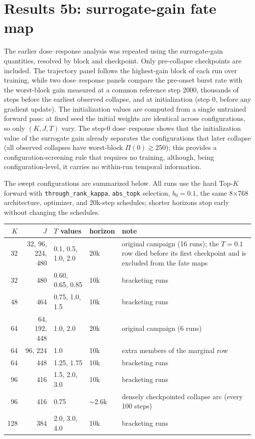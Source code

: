 \documentclass[11pt,a4paper]{article}
\newcommand{\code}[1]{\texttt{#1}}
\newcommand{\Pisurr}{\Pi}
\begin{document}
\section{Results 5b: surrogate-gain fate map}

The earlier dose--response analysis was repeated using the surrogate-gain quantities, resolved by block and checkpoint. Only pre-collapse checkpoints are included. The trajectory panel follows the highest-gain block of each run over training, while two dose--response panels compare the pre-onset burst rate with the worst-block gain measured at a common reference step 2000, thousands of steps before the earliest observed collapse, and at initialization (step 0, before any gradient update). The initialization values are computed from a single untrained forward pass: at fixed seed the initial weights are identical across configurations, so only \((K,J,T)\) vary. The step-0 dose--response shows that the initialization value of the surrogate gain already separates the configurations that later collapse (all observed collapses have worst-block \(\Pisurr(0)\gtrsim250\)); this provides a configuration-screening rule that requires no training, although, being configuration-level, it carries no within-run temporal information.


The swept configurations are summarized below. All runs use the hard
Top-\(K\) forward with \code{through\_rank\_kappa}, \code{abs\_topk}
selection, \(b_0 = 0.1\), the same 8\(\times\)768 architecture, optimizer,
and 20k-step schedules; shorter horizons stop early without changing the
schedules.

\begin{center}\small
\begin{tabular}{rrp{2.6cm}lp{5.6cm}}
\toprule
\(K\) & \(J\) & \(T\) values & horizon & note \\
\midrule
32  & 32, 96, 224, 480 & 0.1, 0.5, 1.0, 2.0 & 20k & original campaign (16
runs); the \(T{=}0.1\) row died before its first checkpoint and is
excluded from the fate maps \\[2pt]
32  & 480 & 0.60, 0.65, 0.85 & 10k & bracketing runs \\
48  & 464 & 0.75, 1.0, 1.5 & 10k & bracketing runs \\
64  & 64, 192, 448 & 1.0, 2.0 & 20k & original campaign (6 runs) \\
64  & 96, 224 & 1.0 & 10k & extra members of the marginal row \\
64  & 448 & 1.25, 1.75 & 10k & bracketing runs \\
96  & 416 & 1.5, 2.0, 3.0 & 10k & bracketing runs \\
96  & 416 & 0.75 & \(\sim\)2.6k & densely checkpointed collapse arc (every
100 steps) \\
128 & 384 & 2.0, 3.0, 4.0 & 10k & bracketing runs \\
\bottomrule
\end{tabular}
\end{center}
\end{document}
